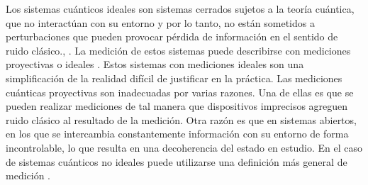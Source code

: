 Los sistemas cuánticos ideales son sistemas cerrados sujetos a la teoría
cuántica, que no interactúan con su entorno y por lo tanto, no están sometidos
a perturbaciones que pueden provocar pérdida de información en el sentido de ruido clásico., .
La medición de estos sistemas puede describirse con mediciones
proyectivas o ideales . Estos sistemas con mediciones ideales son una
simplificación de la realidad difícil de justificar en la práctica. Las
mediciones cuánticas proyectivas son inadecuadas por varias razones. Una de
ellas es que se pueden realizar mediciones de tal manera que dispositivos
imprecisos agreguen ruido clásico al resultado de la medición. Otra razón es
que 
en sistemas abiertos, en los que se intercambia constantemente información con
su entorno de forma incontrolable, lo que resulta en una decoherencia del
estado en estudio. En el
caso de sistemas cuánticos no ideales puede utilizarse
una definición más general de medición {\cite{wilde2011classical,
jaeger2007quantum}}. 


